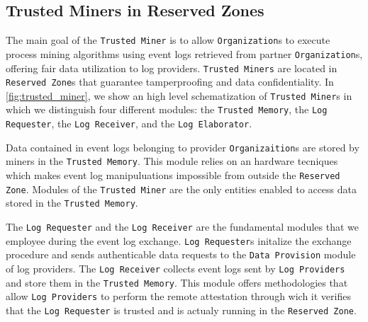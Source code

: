 \subsection{Trusted Miners in Reserved Zones}
The main goal of the \texttt{Trusted Miner} is to allow \texttt{Organization}s to execute process mining algorithms using %
event logs retrieved from partner \texttt{Organization}s, offering fair data utilization to log providers. \texttt{Trusted Miners} are located in \texttt{Reserved Zone}s that guarantee tamperproofing and data confidentiality. In \cref{fig:trusted_miner}, we show an high level schematization of \texttt{Trusted Miner}s in which we distinguish four different modules: the \texttt{Trusted Memory}, the \texttt{Log Requester}, the \texttt{Log Receiver}, and the \texttt{Log Elaborator}.

Data contained in event logs belonging to provider \texttt{Organizaition}s are stored by miners in the \texttt{Trusted Memory}. This module relies on an hardware tecniques which makes event log manipuluations impossible from outside the \texttt{Reserved Zone}. Modules of the \texttt{Trusted Miner} are the only entities enabled to access data stored in the \texttt{Trusted Memory}. %

The \texttt{Log Requester} and the \texttt{Log Receiver} are the fundamental modules that we employee during the event log exchange. \texttt{Log Requester}s initalize the exchange procedure and sends authenticable data requests to the \texttt{Data Provision} module of log providers. The \texttt{Log Receiver} collects event logs sent by \texttt{Log Providers} and store them in the \texttt{Trusted Memory}. This module offers methodologies that allow \texttt{Log Providers} to perform the remote attestation through wich it verifies that the \texttt{Log Requester} is trusted and is actualy running in the \texttt{Reserved Zone}.%

